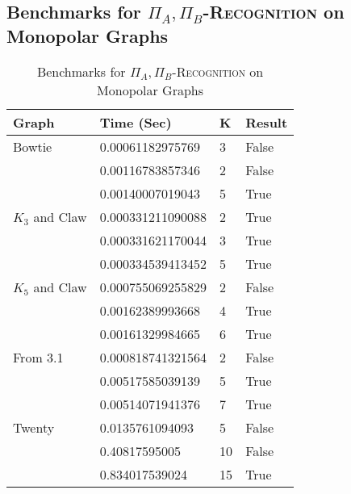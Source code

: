 \documentclass[11pt]{article}
\begin{document}
\subsection{Benchmarks for \textsc{$\Pi_A,$$\Pi_B$-Recognition} on Monopolar Graphs}\label{subsec:mpresults}
\begin{table}[h]\label{fig:mpresults}
\begin{center}
\begin{tabu} to 0.9\textwidth { | X[l] X[l] X[c] X[c] | }
\hline
Graph & Time (Sec) & K & Result \\
[0.5ex]
\hline
\hline
Bowtie & 0.00061182975769 & 3 & False \\
[0.3ex]
 & 0.00116783857346 & 2 & False \\
 [0.3ex]
 & 0.00140007019043 & 5 & True \\
 [0.3ex]
 \hline
$K_3$ and Claw & 0.000331211090088 & 2 & True \\
[0.3ex]
 & 0.000331621170044 & 3 & True \\
 [0.3ex]
 & 0.000334539413452 & 5 & True \\
 [0.3ex]
 \hline
$K_5$ and Claw & 0.000755069255829 & 2 & False \\
[0.3ex]
 & 0.00162389993668 & 4 & True \\
 [0.3ex]
 & 0.00161329984665 & 6 & True \\
 [0.3ex]
 \hline
From 3.1 & 0.000818741321564 & 2 & False \\
[0.3ex]
 & 0.00517585039139 & 5 & True \\
 [0.3ex]
 & 0.00514071941376 & 7 & True \\
 [0.3ex]
 \hline
Twenty & 0.0135761094093 & 5 & False \\
[0.3ex]
 & 0.40817595005 & 10 & False \\
 [0.3ex]
 & 0.834017539024 & 15 & True \\
 [0.3ex]
 \hline
\end{tabu}
\end{center}
\caption{Benchmarks for \textsc{$\Pi_A,$$\Pi_B$-Recognition} on Monopolar Graphs}
\end{table}
\end{document}
